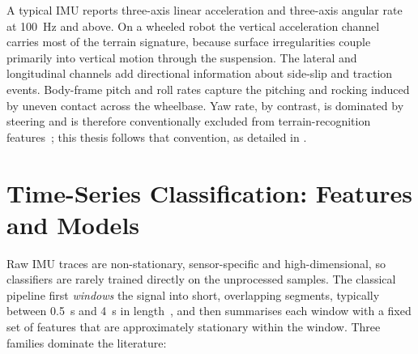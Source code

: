 A typical IMU reports three-axis linear acceleration and three-axis angular rate at \SI{100}{\hertz} and above. On a wheeled robot the vertical acceleration channel carries most of the terrain signature, because surface irregularities couple primarily into vertical motion through the suspension. The lateral and longitudinal channels add directional information about side-slip and traction events. Body-frame pitch and roll rates capture the pitching and rocking induced by uneven contact across the wheelbase. Yaw rate, by contrast, is dominated by steering and is therefore conventionally excluded from terrain-recognition features~\cite{Brooks2005}; this thesis follows that convention, as detailed in .

\section{Time-Series Classification: Features and Models}
\label{sec:bg-features-ml}

Raw IMU traces are non-stationary, sensor-specific and high-dimensional, so classifiers are rarely trained directly on the unprocessed samples. The classical pipeline first \emph{windows} the signal into short, overlapping segments, typically between \SI{0.5}{\second} and \SI{4}{\second} in length~\cite{Brooks2005,Weiss2011}, and then summarises each window with a fixed set of features that are approximately stationary within the window. Three families dominate the literature:

